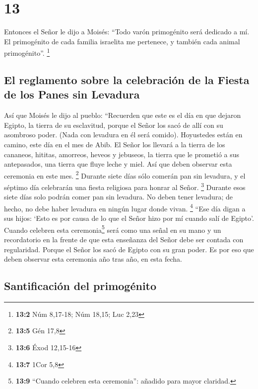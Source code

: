 \hypertarget{section-12}{%
\section{13}\label{section-12}}

 Entonces el Señor le dijo a Moisés:  ``Todo
varón primogénito será dedicado a mí. El primogénito de cada familia
israelita me pertenece, y también cada animal primogénito''. \footnote{\textbf{13:2}
  Núm 8,17-18; Núm 18,15; Luc 2,23}

\hypertarget{el-reglamento-sobre-la-celebraciuxf3n-de-la-fiesta-de-los-panes-sin-levadura}{%
\subsection{El reglamento sobre la celebración de la Fiesta de los Panes
sin
Levadura}\label{el-reglamento-sobre-la-celebraciuxf3n-de-la-fiesta-de-los-panes-sin-levadura}}

 Así que Moisés le dijo al pueblo: ``Recuerden que este es
el día en que dejaron Egipto, la tierra de su esclavitud, porque el
Señor los sacó de allí con su asombroso poder. (Nada con levadura en él
será comido).  Hoyustedes están en camino, este día en el
mes de Abib.  El Señor los llevará a la tierra de los
cananeos, hititas, amorreos, heveos y jebuseos, la tierra que le
prometió a sus antepasados, una tierra que fluye leche y miel. Así que
deben observar esta ceremonia en este mes. \footnote{\textbf{13:5} Gén
  17,8}  Durante siete días sólo comerán pan sin levadura,
y el séptimo día celebrarán una fiesta religiosa para honrar al Señor.
\footnote{\textbf{13:6} Éxod 12,15-16}  Durante esos siete
días solo podrán comer pan sin levadura. No deben tener levadura; de
hecho, no debe haber levadura en ningún lugar donde vivan. \footnote{\textbf{13:7}
  1Cor 5,8}  ``Ese día digan a sus hijos: `Esto es por
causa de lo que el Señor hizo por mí cuando salí de Egipto'.
 Cuando celebren esta ceremonia\footnote{\textbf{13:9}
  ``Cuando celebren esta ceremonia'': añadido para mayor claridad.} será
como una señal en su mano y un recordatorio en la frente de que esta
enseñanza del Señor debe ser contada con regularidad. Porque el Señor
los sacó de Egipto con su gran poder.  Es por eso que
deben observar esta ceremonia año tras año, en esta fecha.

\hypertarget{santificaciuxf3n-del-primoguxe9nito}{%
\subsection{Santificación del
primogénito}\label{santificaciuxf3n-del-primoguxe9nito}}

